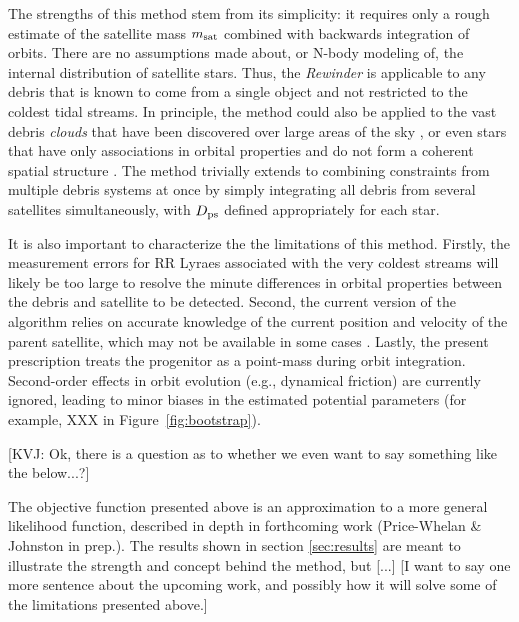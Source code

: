 \documentclass[preprint]{aastex}
\begin{document}
The strengths of this method stem from its simplicity: it requires
only a rough estimate of the satellite mass $m_{\rm sat}$ combined
with backwards integration of orbits. There are no assumptions made
about, or N-body modeling of, the internal distribution of satellite
stars. Thus, the \emph{Rewinder} is applicable to any debris that is
known to come from a single object and not restricted to the coldest
tidal streams. In principle, the method could also be applied to the
vast debris {\it clouds} that have been discovered over large areas of
the sky \citep[e.g. the Triangulum Andromeda and Hercules-Aquila
  clouds]{rochapinto04,belokurov06}, or even stars that have only
associations in orbital properties and do not form a coherent spatial
structure \citep[such as the angular momentum groupings in local
  giants found by][]{helmi99}. The method trivially extends to
combining constraints from multiple debris systems at once by simply
integrating all debris from several satellites simultaneously, with
$D_{\rm ps}$ defined appropriately for each star.

It is also important to characterize the the limitations of this
method. Firstly, the measurement errors for RR Lyraes associated with
the very coldest streams \citep[e.g., the globular clusters Pal5 and
  GD1;][]{odenkirchen02,koposov10} will likely be too large to resolve
the minute differences in orbital properties between the debris and
satellite to be detected. Second, the current version of the algorithm
relies on accurate knowledge of the current position and velocity of
the parent satellite, which may not be available in some cases
\citep[for example, the Orphan Stream;][]{belokurov07}. Lastly, the
present prescription treats the progenitor as a point-mass during
orbit integration. Second-order effects in orbit evolution (e.g.,
dynamical friction) are currently ignored, leading to minor biases in
the estimated potential parameters (for example, XXX in
Figure~\ref{fig:bootstrap}).

[KVJ: Ok, there is a question as to whether we even want to say something like the below...?]

The objective function presented above is an approximation to a more
general likelihood function, described in depth in forthcoming work
(Price-Whelan \& Johnston in prep.). The results shown in section
\ref{sec:results} are meant to illustrate the strength and concept
behind the method, but [...] [I want to say one more sentence about
  the upcoming work, and possibly how it will solve some of the
  limitations presented above.]
\end{document}
